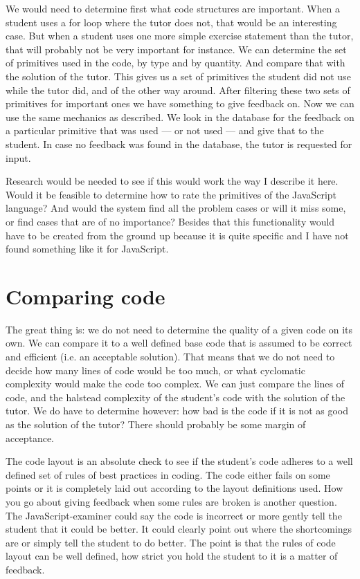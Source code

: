 \documentclass{article}
\begin{document}
We would need to determine first what code structures are important. When a
student uses a for loop where the tutor does not, that would be an
interesting case. But when a student uses one more simple exercise statement
than the tutor, that will probably not be very important for instance. We can
determine the set of primitives used in the code, by type and by quantity. And
compare that with the solution of the tutor. This gives us a set of
primitives the student did not use while the tutor did, and of the other way
around. After filtering these two sets of primitives for important ones we have
something to give feedback on. Now we can use the same mechanics as
\citet{watson2011learning} described. We look in the database for the feedback
on a particular primitive that was used --- or not used --- and give that to
the student. In case no feedback was found in the database, the tutor is
requested for input.

Research would be needed to see if this would work the way I describe it
here. Would it be feasible to determine how to rate the primitives of the
JavaScript language? And would the system find all the problem cases or will it
miss some, or find cases that are of no importance? Besides that this functionality would have to be created from the ground up because it is quite specific and I have not found something like it for JavaScript.

\section{Comparing code}

The great thing is: we do not need to determine the quality of a given code
on its own. We can compare it to a well defined base code that is assumed to be
correct and efficient (i.e. an acceptable solution). That means that we do not
need to decide how many lines of code would be too much, or what cyclomatic
complexity would make the code too complex. We can just compare the lines of
code, and the halstead complexity of the student's code with the solution of
the tutor. We do have to determine however: how bad is the code if it is not as
good as the solution of the tutor? There should probably be some margin of
acceptance.

The code layout is an absolute check to see if the student's code adheres to a
well defined set of rules of best practices in coding. The code either fails on
some points or it is completely laid out according to the layout definitions
used. How you go about giving feedback when some rules are broken is another
question. The JavaScript-examiner could say the code is incorrect or more
gently tell the student that it could be better. It could clearly point out
where the shortcomings are or simply tell the student to do better. The point
is that the rules of code layout can be well defined, how strict you hold the
student to it is a matter of feedback.
\end{document}
